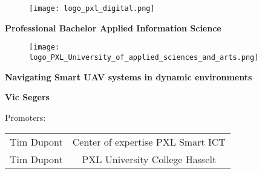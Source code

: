 \begin{titlepage}
  \color{pxlgreen}
  \begin{figure}
    \centering
    \texttt{[image: logo\_pxl\_digital.png]}
  \end{figure}
  \vspace{\baselineskip}
  \begin{center}
    \LARGE\textbf{\textcolor{pxlgreen}{Professional Bachelor Applied Information Science}}
  \end{center}
  \vspace{\baselineskip}
  \begin{figure}[h]
    \centering
    \texttt{[image: logo\_PXL\_University\_of\_applied\_sciences\_and\_arts.png]}
  \end{figure}
  \begin{center}
    \Huge\textbf{\textcolor{pxlgreen}{Navigating Smart UAV systems in dynamic environments}}
  \end{center}
  \vspace{\baselineskip}
  \begin{center}
    \Large\textbf{\textcolor{pxlgreen}{Vic Segers}}
  \end{center}
  \vspace{\baselineskip}
  \begin{center}
    \large\textcolor{pxlgreen}{Promoters:}
  \end{center}
  \begin{tabularx}{\textwidth}{C C}
    Tim Dupont & Center of expertise PXL Smart ICT\\
    Tim Dupont & PXL University College Hasselt
  \end{tabularx}
\end{titlepage}